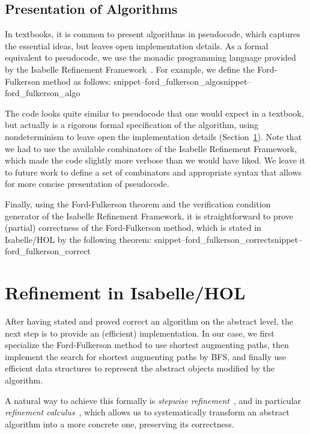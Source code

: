 \documentclass[smallcondensed]{svjour3}     %
\newcommand{\Snippet}[1]{\ifcsname snippet--#1\endcsname\csname snippet--#1\endcsname\else\PackageError{}{No snippet '#1' defined.}{}\fi}
\begin{document}
\subsection{Presentation of Algorithms}
In textbooks, it is common to present algorithms in pseudocode, which captures the essential ideas, but leaves open implementation details. As a formal equivalent to pseudocode, we use the monadic programming language provided by the Isabelle Refinement Framework~\cite{LaTu12,La12}. For example, we define the Ford-Fulkerson method as follows:
\Snippet{ford_fulkerson_algo}

The code looks quite similar to pseudocode that one would expect in a textbook, but actually is a rigorous formal specification of the algorithm, using nondeterminism to leave open the implementation details (\cf Section~\ref{sec:refinement}). Note that we had to use the available combinators of the Isabelle Refinement Framework, which made the code slightly more verbose than we would have liked. We leave it to future work to define a set of combinators and appropriate syntax that allows for more concise presentation of pseudocode.


Finally, using the Ford-Fulkerson theorem and the verification condition generator of the Isabelle Refinement Framework, it is straightforward to prove (partial) correctness of
the Ford-Fulkerson method, which is stated in Isabelle/HOL by the following theorem:
\Snippet{ford_fulkerson_correct}

\section{Refinement in Isabelle/HOL}\label{sec:refinement}
After having stated and proved correct an algorithm on the abstract level, the next step is to provide an (efficient) implementation. 
In our case, we first specialize the Ford-Fulkerson method to use shortest augmenting paths, then implement the search for shortest augmenting paths by BFS, and finally use efficient data structures to represent the abstract objects modified by the algorithm. 

A natural way to achieve this formally is \emph{stepwise refinement}~\cite{Wirth71}, and in particular \emph{refinement calculus}~\cite{Back78,BaWr98}, which allows us to systematically transform an abstract algorithm into a more concrete one, preserving its correctness.
\end{document}
